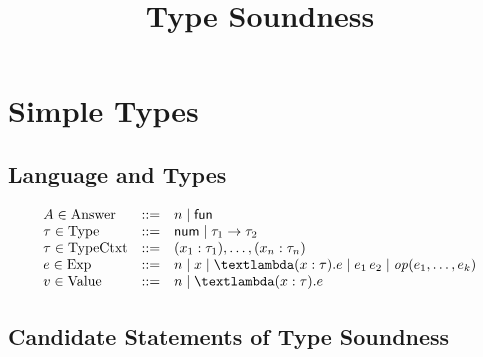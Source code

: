 \documentclass{article}
\title{Type Soundness}
\author{}
\date{}
\begin{document}
\maketitle

\section{Simple Types}
\subsection{Language and Types}

\[\begin{array}{lcl}
\NT{A}{Answer} \NTEq
    n \NTSep
    \LAFun
    \\
\NT{\Gt}{Type} \NTEq
    \TNum \NTSep
    \TArrow{\Gt_1}{\Gt_2}
    \\
\NT{\Gt}{TypeCtxt} \NTEq
    (\TAnn{x_1}{\Gt_1}), \dots, (\TAnn{x_n}{\Gt_n})
    \\
\NT{e}{Exp} \NTEq
    n \NTSep
    x \NTSep
    \TFun{(\TAnn{x}{\Gt})}{e} \NTSep
    \TApp{e_1}{e_2} \NTSep
    \TOp{e_1,\dots,e_k}
    \\
\NT{v}{Value} \NTEq
    n \NTSep
    \TFun{(\TAnn{x}{\Gt})}{e}
\end{array}\]

\subsection{Candidate Statements of Type Soundness}
\end{document}
